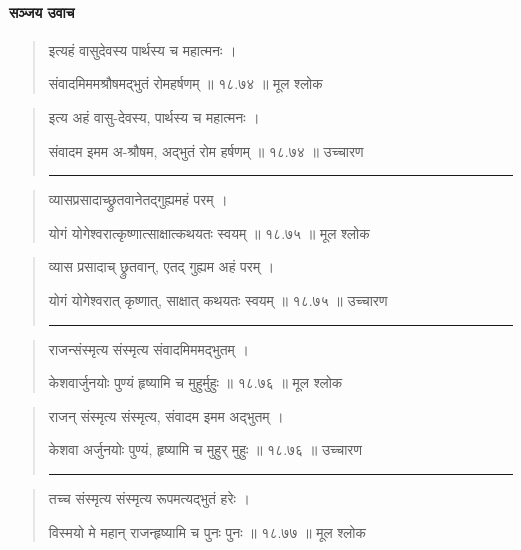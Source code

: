 \paragraph{\sanskrit सञ्जय उवाच}
\begin{quotation} 
इत्यहं वासुदेवस्य पार्थस्य च महात्मनः  ।  

संवादमिममश्रौषमद्भुतं रोमहर्षणम्‌  ॥ १८.७४ ॥  मूल श्लोक
\end{quotation}

\begin{quotation}

इत्य अहं वासु-देवस्य, पार्थस्य च महात्मनः  ।  

संवादम इमम अ-श्रौषम, अद्भुतं रोम हर्षणम्‌  ॥ १८.७४ ॥  उच्चारण

\noindent\rule{16cm}{0.4pt} 
\end{quotation}


\begin{quotation}

व्यासप्रसादाच्छ्रुतवानेतद्‍गुह्यमहं परम्‌  ।  

योगं योगेश्वरात्कृष्णात्साक्षात्कथयतः स्वयम्‌  ॥ १८.७५ ॥  मूल श्लोक
\end{quotation}

\begin{quotation}

व्यास प्रसादाच् छ्रुतवान्, एतद्‍ गुह्यम अहं परम्‌  ।  

योगं योगेश्वरात् कृष्णात्, साक्षात् कथयतः स्वयम्‌  ॥ १८.७५ ॥  उच्चारण

\noindent\rule{16cm}{0.4pt} 
\end{quotation}


\begin{quotation}


राजन्संस्मृत्य संस्मृत्य संवादमिममद्भुतम्‌  ।  

केशवार्जुनयोः पुण्यं हृष्यामि च मुहुर्मुहुः  ॥ १८.७६ ॥  मूल श्लोक
\end{quotation}

\begin{quotation}

राजन् संस्मृत्य संस्मृत्य, संवादम इमम अद्भुतम्‌  ।  

केशवा अर्जुनयोः पुण्यं, हृष्यामि च मुहुर् मुहुः  ॥ १८.७६ ॥  उच्चारण

\noindent\rule{16cm}{0.4pt} 
\end{quotation}


\begin{quotation}

तच्च संस्मृत्य संस्मृत्य रूपमत्यद्भुतं हरेः  ।  

विस्मयो मे महान्‌ राजन्हृष्यामि च पुनः पुनः  ॥ १८.७७ ॥  मूल श्लोक
\end{quotation}

